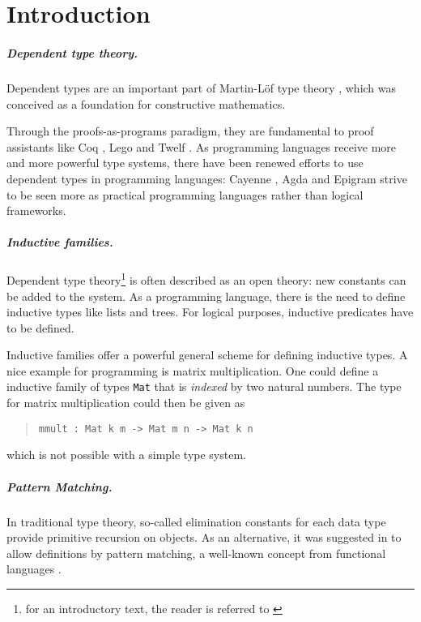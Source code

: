 \chapter{Introduction}

\paragraph*{Dependent type theory.}

Dependent types are an important part of Martin-L\"of type theory \cite{mart84}, which
was conceived as a foundation for constructive mathematics.

Through the proofs-as-programs paradigm, they are fundamental to proof assistants
like Coq \cite{coq}, Lego \cite{pollack94theory} and Twelf \cite{pfenning99system}.
As programming languages receive more and more powerful type systems, there have been renewed efforts to use dependent types in programming languages: Cayenne \cite{augustsson98cayenne}, Agda \cite{norell:thesis} and Epigram \cite{epigram} strive to be seen more as practical programming languages rather than logical frameworks.

\paragraph*{Inductive families.}
Dependent type theory\footnote{for an introductory text, the reader is referred to \cite{NPS:promlt}}
 is often described as an open theory: new constants can be added to the system.
As a programming language, there is the need to define inductive types like lists and trees.
For logical purposes, inductive predicates have to be defined.

Inductive families \cite{dybjer94inductive} offer a powerful general scheme for defining inductive types.
A nice example for programming is matrix multiplication.
One could define a inductive family of types \verb+Mat+ that is \emph{indexed} by two natural numbers.
The type for matrix multiplication could then be given as
\begin{quote}
\begin{verbatim}
mmult : Mat k m -> Mat m n -> Mat k n
\end{verbatim}
\end{quote}
which is not possible with a simple type system.
\paragraph*{Pattern Matching.}
In traditional type theory, so-called elimination constants for each data type provide primitive recursion on objects.
As an alternative, it was suggested in \cite{coquand92pattern} to allow definitions by pattern matching, a well-known concept from functional languages \cite{DBLP:conf/fpca/Augustsson85}.

